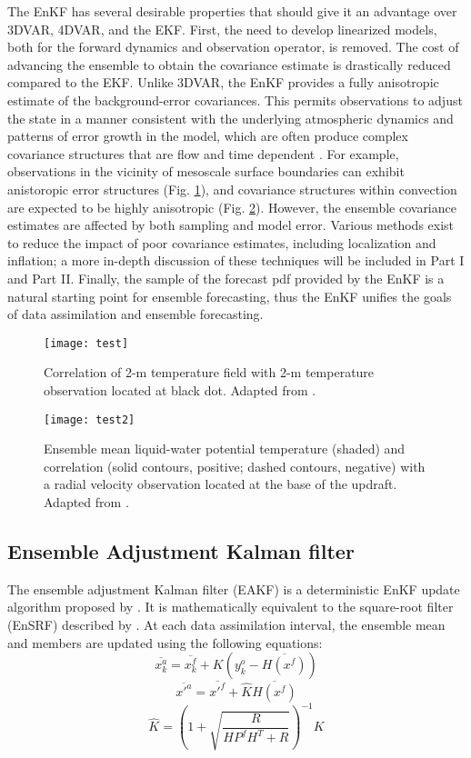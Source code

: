 The EnKF has several desirable properties that should give it an advantage over 3DVAR, 4DVAR, and the EKF. First, the need to develop linearized models, both for the forward dynamics and observation operator, is removed. The cost of advancing the ensemble to obtain the covariance estimate is drastically reduced compared to the EKF. Unlike 3DVAR, the EnKF provides a fully anisotropic estimate of the background-error covariances. This permits observations to adjust the state in a manner consistent with the underlying atmospheric dynamics and patterns of error growth in the model, which are often produce complex covariance structures that are flow and time dependent \citep{bouttier94}. For example, observations in the vicinity of mesoscale surface boundaries can exhibit anistoropic error structures (Fig. \ref{cov1}), and covariance structures within convection are expected to be highly anisotropic (Fig. \ref{cov2}). However, the ensemble covariance estimates are affected by both sampling and model error. Various methods exist to reduce the impact of poor covariance estimates, including localization and inflation; a more in-depth discussion of these techniques will be included in Part I and Part II. Finally, the sample of the forecast pdf provided by the EnKF is a natural starting point for ensemble forecasting, thus the EnKF unifies the goals of data assimilation and ensemble forecasting.

\begin{figure}
\centering
\texttt{[image: test]}
\caption{Correlation of 2-m temperature field with 2-m temperature observation located at black dot. Adapted from \citet{knopfmeierstensrud13}. }
\label{cov1}
\end{figure}
\begin{figure}
\centering
\texttt{[image: test2]}
\caption{Ensemble mean liquid-water potential temperature (shaded) and correlation (solid contours, positive; dashed contours, negative) with a radial velocity observation located at the base of the updraft. Adapted from \citet{snyderzhang03}. }
\label{cov2}
\end{figure}

\subsection{Ensemble Adjustment Kalman filter}
\label{eakf}
The ensemble adjustment Kalman filter (EAKF) is a deterministic EnKF update algorithm proposed by \citet{anderson01}. It is mathematically equivalent to the square-root filter (EnSRF) described by \citet{whitakerhamill02}. At each data assimilation interval, the ensemble mean and members are updated using the following equations:
\begin{equation}
   \overline{x_k^a} = \overline{x_k^f} + K(y_k^o - \overline{H(x^f)})
\end{equation}
\begin{equation}
   \overline{x'^a} = \overline{x'^f} + \hat{K}\overline{H(x^f)}
\end{equation}
\begin{equation}
   \hat{K} = (1 + \sqrt{\frac{R}{HP^fH^T + R}})^{-1}K
\end{equation}

